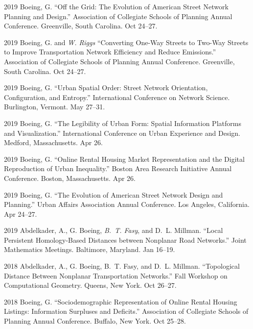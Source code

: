 \documentclass[12pt,letterpaper]{report}
\begin{document}
\begin{tablist}
        \item[2019] \tab{}Boeing, G. \enquote{Off the Grid: The Evolution of American Street Network Planning and Design.} Association of Collegiate Schools of Planning Annual Conference. Greenville, South Carolina. Oct 24--27.

        \item[2019] \tab{}Boeing, G. and \textit{W. Riggs} \enquote{Converting One-Way Streets to Two-Way Streets to Improve Transportation Network Efficiency and Reduce Emissions.} Association of Collegiate Schools of Planning Annual Conference. Greenville, South Carolina. Oct 24--27.

        \item[2019] \tab{}Boeing, G. \enquote{Urban Spatial Order: Street Network Orientation, Configuration, and Entropy.} International Conference on Network Science. Burlington, Vermont. May 27--31.

        \item[2019] \tab{}Boeing, G. \enquote{The Legibility of Urban Form: Spatial Information Platforms and Visualization.} International Conference on Urban Experience and Design. Medford, Massachusetts. Apr 26.

        \item[2019] \tab{}Boeing, G. \enquote{Online Rental Housing Market Representation and the Digital Reproduction of Urban Inequality.} Boston Area Research Initiative Annual Conference. Boston, Massachusetts. Apr 26.

        \item[2019] \tab{}Boeing, G. \enquote{The Evolution of American Street Network Design and Planning.} Urban Affairs Association Annual Conference. Los Angeles, California. Apr 24--27.

        \item[2019] \tab{}Abdelkader, A., G. Boeing, \textit{B.~T. Fasy}, and D.~L. Millman. \enquote{Local Persistent Homology-Based Distances between Nonplanar Road Networks.} Joint Mathematics Meetings. Baltimore, Maryland. Jan 16--19.

        \item[2018] \tab{}Abdelkader, A., G. Boeing, B.~T. Fasy, and D.~L. Millman. \enquote{Topological Distance Between Nonplanar Transportation Networks.} Fall Workshop on Computational Geometry. Queens, New York. Oct 26--27.

        \item[2018] \tab{}Boeing, G. \enquote{Sociodemographic Representation of Online Rental Housing Listings: Information Surpluses and Deficits.} Association of Collegiate Schools of Planning Annual Conference. Buffalo, New York. Oct 25--28.


\end{tablist}
\end{document}
